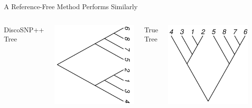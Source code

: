 \documentclass{beamer}
\begin{document}
\begin{frame}{A Reference-Free Method Performs Similarly}
	\begin{columns}
		\begin{center}
		DiscoSNP++ Tree
		\end{center}
		\includegraphics[width=\linewidth]{disco_tree_rightwards.pdf}
		\begin{center}
		True Tree
		\end{center}
		\includegraphics[width=\linewidth,angle=90]{true_tree.pdf}
	\end{columns}
\end{frame}
\end{document}
